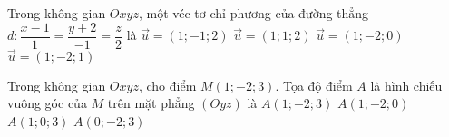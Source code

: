 \begin{ex}%
	Trong không gian $Oxyz$, một véc-tơ chỉ phương của đường thẳng $d\colon \dfrac{x-1}{1}=\dfrac{y+2}{-1}=\dfrac{z}{2}$ là
	\choice
	{\True $\overrightarrow{u}=(1;-1;2)$}
	{$\overrightarrow{u}=(1;1;2)$}
	{$\overrightarrow{u}=(1;-2;0)$}
	{$\overrightarrow{u}=(1;-2;1)$}
\end{ex}

\begin{ex}%
	Trong không gian $Oxyz$, cho điểm $M(1;-2;3)$. Tọa độ điểm $A$ là hình chiếu vuông góc của $M$ trên mặt phẳng $(Oyz)$ là
	\choice
	{$A(1;-2;3)$}
	{$A(1;-2;0)$}
	{$A(1;0;3)$}
	{\True $A(0;-2;3)$}
\end{ex}

